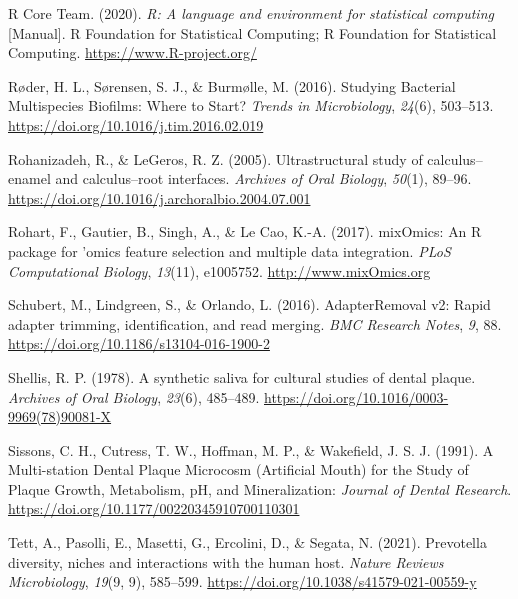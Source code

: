 \documentclass[
]{article}
\newlength{\cslhangindent}
\newlength{\cslentryspacingunit} %
\newenvironment{CSLReferences}[2] %
 {%
  \setlength{\parindent}{0pt}
  \ifodd #1
  \let\oldpar\par
  \def\par{\hangindent=\cslhangindent\oldpar}
  \fi
  \setlength{\parskip}{#2\cslentryspacingunit}
 }%
 {}
\begin{document}
\begin{CSLReferences}{1}{0}
\leavevmode{}%
R Core Team. (2020). \emph{R: {A} language and environment for
statistical computing} {[}Manual{]}. {R Foundation for Statistical
Computing}; {R Foundation for Statistical Computing}.
\url{https://www.R-project.org/}

\leavevmode{}%
Røder, H. L., Sørensen, S. J., \& Burmølle, M. (2016). Studying
{Bacterial Multispecies Biofilms}: {Where} to {Start}? \emph{Trends in
Microbiology}, \emph{24}(6), 503--513.
\url{https://doi.org/10.1016/j.tim.2016.02.019}

\leavevmode{}%
Rohanizadeh, R., \& LeGeros, R. Z. (2005). Ultrastructural study of
calculus--enamel and calculus--root interfaces. \emph{Archives of Oral
Biology}, \emph{50}(1), 89--96.
\url{https://doi.org/10.1016/j.archoralbio.2004.07.001}

\leavevmode{}%
Rohart, F., Gautier, B., Singh, A., \& Le Cao, K.-A. (2017). {mixOmics}:
{An R} package for 'omics feature selection and multiple data
integration. \emph{PLoS Computational Biology}, \emph{13}(11), e1005752.
\url{http://www.mixOmics.org}

\leavevmode{}%
Schubert, M., Lindgreen, S., \& Orlando, L. (2016). {AdapterRemoval} v2:
Rapid adapter trimming, identification, and read merging. \emph{BMC
Research Notes}, \emph{9}, 88.
\url{https://doi.org/10.1186/s13104-016-1900-2}

\leavevmode{}%
Shellis, R. P. (1978). A synthetic saliva for cultural studies of dental
plaque. \emph{Archives of Oral Biology}, \emph{23}(6), 485--489.
\url{https://doi.org/10.1016/0003-9969(78)90081-X}

\leavevmode{}%
Sissons, C. H., Cutress, T. W., Hoffman, M. P., \& Wakefield, J. S. J.
(1991). A {Multi-station Dental Plaque Microcosm} ({Artificial Mouth})
for the {Study} of {Plaque Growth}, {Metabolism}, {pH}, and
{Mineralization}: \emph{Journal of Dental Research}.
\url{https://doi.org/10.1177/00220345910700110301}

\leavevmode{}%
Tett, A., Pasolli, E., Masetti, G., Ercolini, D., \& Segata, N. (2021).
Prevotella diversity, niches and interactions with the human host.
\emph{Nature Reviews Microbiology}, \emph{19}(9, 9), 585--599.
\url{https://doi.org/10.1038/s41579-021-00559-y}


\end{CSLReferences}
\end{document}
